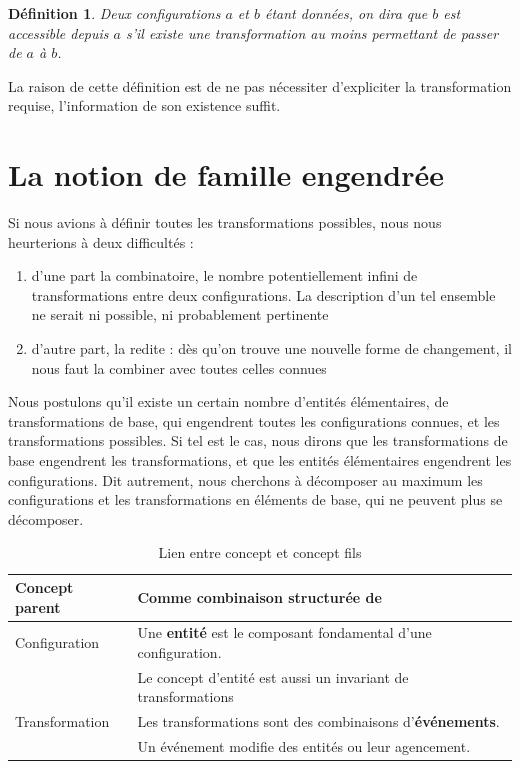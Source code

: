 \documentclass{report}
\newtheorem{definition}{Définition}[section]
\begin{document}
	\begin{definition}
		Deux configurations $a$ et $b$ étant données, on dira que $b$ est accessible depuis $a$ s'il existe une transformation au moins permettant de passer de $a$ à $b$. 
	\end{definition}
	
	La raison de cette définition est de ne pas nécessiter d'expliciter la transformation requise, l'information de son existence suffit. 
	
	
	\section{La notion de famille engendrée}
	
	Si nous avions à définir toutes les transformations possibles, nous nous heurterions à deux difficultés : 
	\begin{enumerate}
		\item d'une part la combinatoire, le nombre potentiellement infini de transformations entre deux configurations. La description d'un tel ensemble ne serait ni possible, ni probablement pertinente
		\item d'autre part, la redite : dès qu'on trouve une nouvelle forme de changement, il nous faut la combiner avec toutes celles connues
	\end{enumerate}
	
	Nous postulons qu'il existe un certain nombre d'entités élémentaires, de transformations de base, qui engendrent toutes les configurations connues, et les transformations possibles. Si tel est le cas, nous dirons que les transformations de base engendrent les transformations, et que les entités élémentaires engendrent les configurations. Dit autrement, nous cherchons à décomposer au maximum les configurations et les transformations en éléments de base, qui ne peuvent plus se décomposer. 
	
	\begin{table}[H]
		\centering
		\begin{tabular}{|l|l|}
			\hline 
			\textbf{Concept parent} & \textbf{Comme combinaison structurée de} \\
			\hline 
			Configuration & Une \textbf{entité} est le composant fondamental d'une configuration. \\
			& Le concept d'entité est aussi un invariant de transformations \\
			\hline 
			Transformation & Les transformations sont des combinaisons d'\textbf{événements}. \\
			& Un événement modifie des entités ou leur agencement.  \\
			\hline 
		\end{tabular}
		\caption{Lien entre concept et concept fils}
	\end{table}
	
\end{document}
